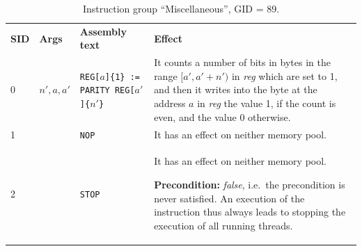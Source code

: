 \documentclass[10pt,twocolumn]{article}
\begin{document}
\begin{table}[!h]
\begin{center}
\def\arraystretch{1.5}
\begin{tabular}{lp{1.2cm}p{5.5cm}p{7.5cm}}
\textbf{SID} & \textbf{Args} & \textbf{Assembly text} & \textbf{Effect}
\\

0 & $ n',a,a' $ %
& \texttt{REG[}$ a $\texttt{]\{1\} := PARITY REG[}$ a' $\texttt{]\{}$ n'
$\texttt{\}} %
& It counts a number of bits in bytes in the range $ [a',a'+n') $ in
\textit{reg} which are set to 1, and then it writes into the byte at the address
$ a $ in \textit{reg} the value 1, if the count is even, and the value 0
otherwise. \\

1 &  %
& \texttt{NOP} %
& It has an effect on neither memory pool. \\

2 &  %
& \texttt{STOP} %
& It has an effect on neither memory pool.

\textbf{Precondition:} \textit{false}, i.e.~the precondition is never satisfied.
An execution of the instruction thus always leads to stopping the execution of
all running threads.\\

\end{tabular}
\end{center}
\caption{Instruction group ``Miscellaneous'', GID = 89.}
\label{tab:igroup:miscellaneous}
\end{table}







\end{document}
